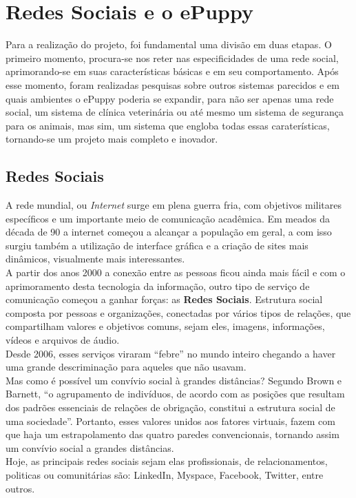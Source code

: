 \chapter{Redes Sociais e o ePuppy}
Para a realização do projeto, foi fundamental uma divisão em duas etapas. O primeiro momento, procura-se nos reter nas especificidades de uma rede social, aprimorando-se em suas características básicas e em seu comportamento. Após esse momento, foram realizadas pesquisas sobre outros sistemas parecidos e em quais ambientes o ePuppy poderia se expandir, para não ser apenas uma rede social, um sistema de clínica veterinária ou até mesmo um sistema de segurança para os animais, mas sim, um sistema que engloba todas essas caraterísticas, tornando-se um projeto mais completo e inovador.

\section{Redes Sociais}
A rede mundial, ou {\it Internet} surge em plena guerra fria, com objetivos militares específicos e um importante meio de comunicação acadêmica. Em meados da década de 90 a internet começou a alcançar a população em geral, a com isso surgiu também a utilização de interface gráfica e a criação de sites mais dinâmicos, visualmente mais interessantes.
\\
\indent
A partir dos anos 2000 a conexão entre as pessoas ficou ainda mais fácil e com o aprimoramento desta tecnologia da informação, outro tipo de serviço de comunicação começou a ganhar forças: as {\bf Redes Sociais}. Estrutura social composta por pessoas e organizações, conectadas por vários tipos de relações, que compartilham valores e objetivos comuns, sejam eles, imagens, informações, vídeos e arquivos de áudio.
\\
\indent
Desde 2006, esses serviços viraram “febre” no mundo inteiro chegando a haver uma grande descriminação para aqueles que não usavam.
\\
\indent
Mas como é possível um convívio social à grandes distâncias? Segundo Brown e Barnett, “o agrupamento de indivíduos, de acordo com as posições que resultam dos padrões essenciais de relações de obrigação, constitui a estrutura social de uma sociedade”. Portanto, esses valores unidos aos fatores virtuais, fazem com que haja um estrapolamento das quatro paredes convencionais, tornando assim um convívio social a grandes distâncias.
\\
\indent
Hoje, as principais redes sociais sejam elas profissionais, de relacionamentos, politicas ou comunitárias são: LinkedIn, Myspace, Facebook, Twitter, entre outros.

